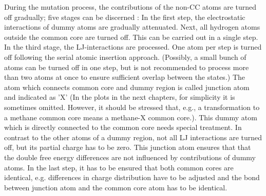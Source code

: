 During the mutation process, the contributions of the non-CC atoms are turned off gradually; five stages can be discerned \cite{Karwounopoulos.2022}:  In the first step, the electrostatic interactions of dummy atoms are gradually attenuated. Next, all hydrogen atoms outside the common core are turned off. This can be carried out in a single step.
In the third stage, the LJ-interactions are processed. One atom per step is turned off following the serial atomic insertion approach. (Possibly, a small bunch of atoms can be turned off in one step, but is not recommended to process more than two atoms at once to ensure sufficient overlap between the states.)
The atom which connects common core and dummy region is  called junction atom and indicated as 'X' \cite{Karwounopoulos.2022} (In the plots in the next chapters, for simplicity it is sometimes omitted. However, it should be stressed that, e.g., a transformation to a methane common core means a methane-X common core.). This dummy atom which is directly connected to the common core needs special treatment. In contrast to the other atoms of a dummy region, not all LJ interactions are turned off, but its partial charge has to be zero.
\cite{Karwounopoulos.2022} This junction atom ensures that that the double free energy differences are not influenced by contributions of dummy atoms. \cite{Fleck.2021}
In the last step, it has to be ensured that both common cores are identical, e.g. differences in charge distribution have to be adjusted and the bond between junction atom and the common core atom has to be identical.

